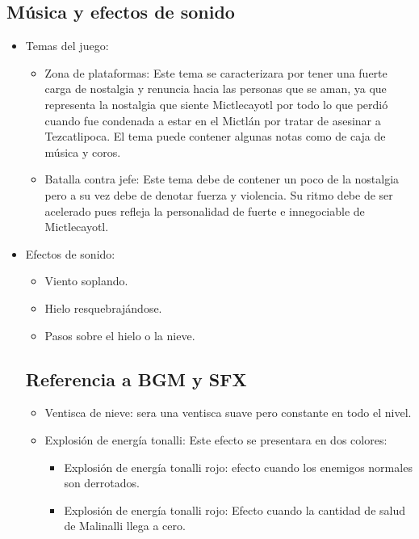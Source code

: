         \subsection{Música y efectos de sonido}
\begin{itemize} 
        \item Temas del juego:
\begin{itemize} 
        \item Zona de plataformas: Este tema se caracterizara por tener una fuerte carga de nostalgia y renuncia hacia las personas que se aman, ya que representa la nostalgia que siente Mictlecayotl por todo lo que perdió cuando fue condenada a estar en el Mictlán por tratar de asesinar a Tezcatlipoca. El tema puede contener algunas notas como de caja de música y coros.
        \item Batalla contra jefe: Este tema debe de contener un poco de la nostalgia pero a su vez debe de denotar fuerza y violencia. Su ritmo debe de ser acelerado pues refleja la personalidad de fuerte e innegociable de Mictlecayotl.
\end{itemize}
        \item Efectos de sonido:
\begin{itemize} 
        \item Viento soplando.
        \item Hielo resquebrajándose.
        \item Pasos sobre el hielo o la nieve.	
\end{itemize}

        \subsection{Referencia a BGM y SFX}
\begin{itemize} 
        \item Ventisca de nieve: sera una ventisca suave pero constante en todo el nivel.
\item Explosión de energía tonalli: Este efecto se presentara en dos colores:
        \begin{itemize}
                \item Explosión de energía tonalli rojo: efecto cuando los enemigos normales son derrotados.
                \item Explosión de energía tonalli rojo: Efecto cuando la cantidad de salud de Malinalli llega a cero.
        \end{itemize}
\end{itemize} 
\end{itemize} 